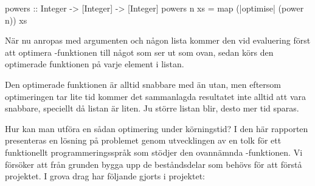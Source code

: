 \documentclass[Rapport]{subfiles}
\begin{document}
\begin{codeExDiff}
powers :: Integer -> [Integer] -> [Integer]
powers n xs = map (|optimise| (power n)) xs
\end{codeExDiff}

När nu  anropas med argumenten  och någon lista  kommer
den vid evaluering först att optimera -funktionen till något som 
ser ut som  ovan, sedan körs den optimerade funktionen på varje
element i listan.

Den optimerade funktionen är alltid snabbare med  än utan, men eftersom
optimeringen tar lite tid kommer det sammanlagda resultatet inte alltid att vara
snabbare, speciellt då listan  är liten. 
Ju större listan  blir, desto mer tid sparas.

Hur kan man utföra en sådan optimering under körningstid? I den här rapporten
presenteras en lösning på problemet genom utvecklingen av en tolk för ett
funktionellt programmeringsspråk som stödjer den ovannämnda -funktionen. Vi försöker
att från grunden bygga upp de beståndsdelar som behövs för att förstå projektet.
I grova drag har följande gjorts i projektet:

\begin{comment}
Koens kommentar:
"Bidrag" separat


skriv lite mer om rapportens uppbyggnad
1. i rätt ordning
2. läsaren? vad menas med detta?
            bra fråga såklart... låt mig tänka
            vet inte men hur överblicken såg ut förut så var det referenser
            först till ektion 3, sen 2 sen 4 osv, han kanske tänkte sig
            en bit med stöd till läsaren också
            har nu flyttat om dem så att de är i ordning iaf
            gott!
            det blir bra
            jag tuggar vidare :D
            fast inte separerat bidrag och överblickish
            then fire z'missiles! men känns onaturligt
            jag håller egentligen med. det blir duplicering. hur ska det skrivas
            på ett naturligt sätt? vet inte riktigt. men ganska likt så som vi hade det fast i ordning och lite mer utvecklat
            tror jag inte blir helt fel
vill vi separera bidrag? ja
\end{comment}
\end{document}
